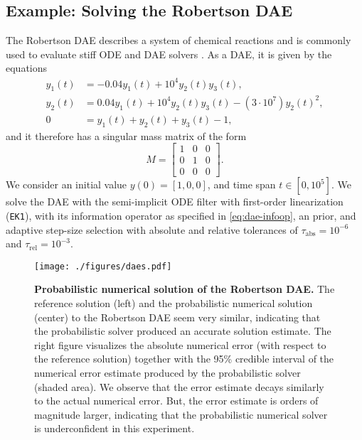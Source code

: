 \documentclass{mimosis}
\begin{document}
\subsection{Example: Solving the Robertson DAE}
\label{sec:org3e0c8f9}
The Robertson DAE describes a system of chemical reactions and is commonly used to evaluate stiff ODE and DAE solvers
\parencite{hairer1987solving}.
As a DAE, it is given by the equations
\begin{subequations}
  \begin{align}
    y_1(t) &= -0.04 y_1(t) + 10^4 y_2(t) y_3(t), \\
    y_2(t) &= 0.04 y_1(t) + 10^4 y_2(t) y_3(t) - (3 \cdot 10^7) y_2(t)^2, \\
    0 &= y_1(t) + y_2(t) + y_3(t) - 1,
  \end{align}
\end{subequations}
and it therefore has a singular mass matrix of the form
\[M = \begin{bmatrix} 1 & 0 & 0 \\ 0 & 1 & 0 \\ 0 & 0 & 0 \end{bmatrix}.\]
We consider an initial value
\(y(0) = [1,0,0]\),
and time span \(t \in [0, 10^5]\).
We solve the DAE with the semi-implicit ODE filter with first-order linearization (\texttt{EK1}), with its information operator as specified in \cref{eq:dae-infoop}, an  prior, and adaptive step-size selection with absolute and relative tolerances of
\(\tau_\text{abs}=10^{-6}\) and \(\tau_\text{rel}=10^{-3}\).

\begin{figure}[t]
\centering
\texttt{[image: ./figures/daes.pdf]}
\caption{\label{fig:pickandmix:dae}\textbf{Probabilistic numerical solution of the Robertson DAE.} The reference solution (left) and the probabilistic numerical solution (center) to the Robertson DAE seem very similar, indicating that the probabilistic solver produced an accurate solution estimate. The right figure visualizes the absolute numerical error (with respect to the reference solution) together with the 95\% credible interval of the numerical error estimate produced by the probabilistic solver (shaded area). We observe that the error estimate decays similarly to the actual numerical error. But, the error estimate is orders of magnitude larger, indicating that the probabilistic numerical solver is underconfident in this experiment.}
\end{figure}
\end{document}
